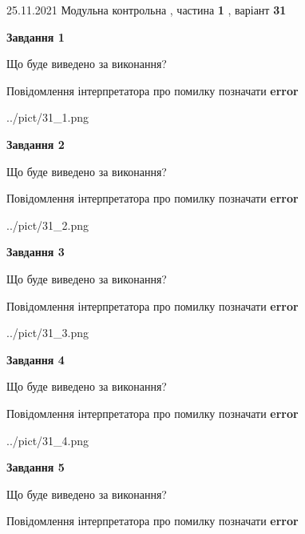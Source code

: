 \documentclass[10pt, ukrainian]{article}
\begin{document}
{25.11.2021 Модульна контрольна , частина \textbf { 1 }, варіант  \No \textbf { 31 }\par}
{
\begin {large}

{\begin {center}\textbf{Завдання 1}\end {center}}\par
Що буде виведено за виконання? \par
Повідомлення інтерпретатора про помилку позначати \textbf{error}

\begin{center}
	{../pict/31_1.png}
\end{center}
\newpage

{\begin {center}\textbf{Завдання 2}\end {center}}\par
Що буде виведено за виконання? \par
Повідомлення інтерпретатора про помилку позначати \textbf{error}

\begin{center}
	{../pict/31_2.png}
\end{center}
\newpage

{\begin {center}\textbf{Завдання 3}\end {center}}\par
Що буде виведено за виконання? \par
Повідомлення інтерпретатора про помилку позначати \textbf{error}

\begin{center}
	{../pict/31_3.png}
\end{center}
\newpage

{\begin {center}\textbf{Завдання 4}\end {center}}\par
Що буде виведено за виконання? \par
Повідомлення інтерпретатора про помилку позначати \textbf{error}

\begin{center}
	{../pict/31_4.png}
\end{center}
\newpage

{\begin {center}\textbf{Завдання 5}\end {center}}\par
Що буде виведено за виконання? \par
Повідомлення інтерпретатора про помилку позначати \textbf{error}


\end{large}}
\end{document}
